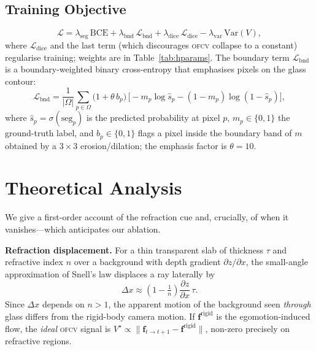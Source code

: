 \documentclass[conference]{IEEEtran}
\newcommand{\ofcv}{\textsc{ofcv}}
\begin{document}
\subsection{Training Objective}
\begin{equation}
\mathcal{L}=\lambda_{\mathrm{seg}}\,\mathrm{BCE}
+\lambda_{\mathrm{bnd}}\,\mathcal{L}_{\mathrm{bnd}}
+\lambda_{\mathrm{dice}}\,\mathcal{L}_{\mathrm{dice}}
-\lambda_{\mathrm{var}}\,\mathrm{Var}(V),
\end{equation}
where $\mathcal{L}_{\mathrm{dice}}$ \cite{milletari2016vnet} and the last term
(which discourages \ofcv{} collapse to a constant) regularise training; weights
are in Table~\ref{tab:hparams}. The boundary term
$\mathcal{L}_{\mathrm{bnd}}$ is a boundary-weighted binary cross-entropy that
emphasises pixels on the glass contour:
\begin{equation}
\mathcal{L}_{\mathrm{bnd}}=\frac{1}{|\Omega|}\sum_{p\in\Omega}
\big(1+\theta\,b_p\big)\,
\big[-m_p\log\hat{s}_p-(1-m_p)\log(1-\hat{s}_p)\big],
\end{equation}
where $\hat{s}_p=\sigma(\mathrm{seg}_p)$ is the predicted probability at pixel
$p$, $m_p\in\{0,1\}$ the ground-truth label, and $b_p\in\{0,1\}$ flags a pixel
inside the boundary band of $m$ obtained by a $3\times3$ erosion/dilation; the
emphasis factor is $\theta=10$.

\section{Theoretical Analysis}
\label{sec:theory}
We give a first-order account of the refraction cue and, crucially, of when it
vanishes---which anticipates our ablation.

\textbf{Refraction displacement.} For a thin transparent slab of thickness
$\tau$ and refractive index $n$ over a background with depth gradient
$\partial z/\partial x$, the small-angle approximation of Snell's law displaces a
ray laterally by
\begin{equation}
\Delta x \approx \left(1-\tfrac{1}{n}\right)\frac{\partial z}{\partial x}\,\tau .
\label{eq:snell}
\end{equation}
Since $\Delta x$ depends on $n>1$, the apparent motion of the background seen
\emph{through} glass differs from the rigid-body camera motion. If
$\mathbf{f}^{\mathrm{rigid}}$ is the egomotion-induced flow, the \emph{ideal}
\ofcv{} signal is $V^\star\propto\lVert\mathbf{f}_{t\to t+1}-\mathbf{f}^{\mathrm{rigid}}\rVert$,
non-zero precisely on refractive regions.
\end{document}
